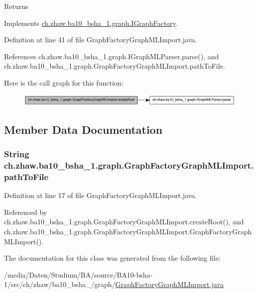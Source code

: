 \begin{DoxyReturn}{Returns}

\end{DoxyReturn}


Implements \hyperlink{interfacech_1_1zhaw_1_1ba10__bsha__1_1_1graph_1_1IGraphFactory_a714465d240775f8a383c0a65356c4add}{ch.zhaw.ba10\_\-bsha\_\-1.graph.IGraphFactory}.

Definition at line 41 of file GraphFactoryGraphMLImport.java.

References ch.zhaw.ba10\_\-bsha\_\-1.graph.IGraphMLParser.parse(), and ch.zhaw.ba10\_\-bsha\_\-1.graph.GraphFactoryGraphMLImport.pathToFile.

Here is the call graph for this function:\nopagebreak
\begin{figure}[H]
\begin{center}
\leavevmode
\includegraphics[width=320pt]{classch_1_1zhaw_1_1ba10__bsha__1_1_1graph_1_1GraphFactoryGraphMLImport_a2936d100be1654461056080ff61edd32_cgraph}
\end{center}
\end{figure}


\subsection{Member Data Documentation}
\hypertarget{classch_1_1zhaw_1_1ba10__bsha__1_1_1graph_1_1GraphFactoryGraphMLImport_a642c45c8a2ca616d6c11d2cc7f971929}{
\subsubsection[{pathToFile}]{\setlength{\rightskip}{0pt plus 5cm}String {\bf ch.zhaw.ba10\_\-bsha\_\-1.graph.GraphFactoryGraphMLImport.pathToFile}}}
\label{classch_1_1zhaw_1_1ba10__bsha__1_1_1graph_1_1GraphFactoryGraphMLImport_a642c45c8a2ca616d6c11d2cc7f971929}


Definition at line 17 of file GraphFactoryGraphMLImport.java.

Referenced by ch.zhaw.ba10\_\-bsha\_\-1.graph.GraphFactoryGraphMLImport.createRoot(), and ch.zhaw.ba10\_\-bsha\_\-1.graph.GraphFactoryGraphMLImport.GraphFactoryGraphMLImport().

The documentation for this class was generated from the following file:\begin{DoxyCompactItemize}
\item 
/media/Daten/Studium/BA/source/BA10-\/bsha-\/1/src/ch/zhaw/ba10\_\-bsha\_/graph/\hyperlink{GraphFactoryGraphMLImport_8java}{GraphFactoryGraphMLImport.java}\end{DoxyCompactItemize}
